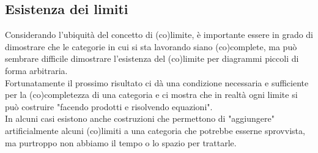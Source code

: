 \documentclass[openany]{book}
\begin{document}
\subsection{Esistenza dei limiti}

Considerando l'ubiquità del concetto di (co)limite, è importante essere in grado di dimostrare che le categorie in cui si sta lavorando siano (co)complete, ma può sembrare difficile dimostrare l'esistenza del (co)limite per diagrammi piccoli di forma arbitraria.\\
Fortunatamente il prossimo risultato ci dà una condizione necessaria e sufficiente per la (co)completezza di una categoria e ci mostra che in realtà ogni limite si può costruire "facendo prodotti e risolvendo equazioni".\\
In alcuni casi esistono anche costruzioni che permettono di "aggiungere" artificialmente alcuni (co)limiti a una categoria che potrebbe esserne sprovvista, ma purtroppo non abbiamo il tempo o lo spazio per trattarle.
\end{document}
